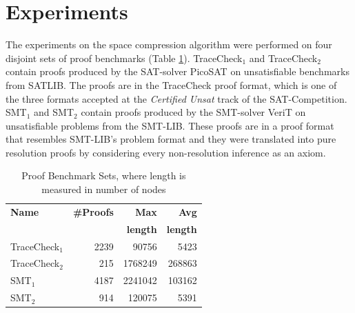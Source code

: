 \section{Experiments} 
\label{sec:experiments}

The experiments on the space compression algorithm were performed on four disjoint sets of proof benchmarks (Table \ref{tab:benchmarks}). 
TraceCheck$_1$ and TraceCheck$_2$ contain proofs produced by the SAT-solver PicoSAT \cite{Biere2008} on unsatisfiable benchmarks from SATLIB. 
The proofs are in the TraceCheck proof format, which is one of the three formats accepted at the \emph{Certified Unsat} track of the SAT-Competition.
SMT$_1$ and SMT$_2$ contain proofs produced by the SMT-solver VeriT \cite{Bouton2009} on unsatisfiable problems from the SMT-LIB. 
These proofs are in a proof format that resembles SMT-LIB's problem format and they were translated into pure resolution proofs by considering every non-resolution inference as an axiom.


\begin{table}[tb]
	\centering
	\setlength{\tabcolsep}{8pt}
	\caption{Proof Benchmark Sets, where length is measured in number of nodes}
	\label{tab:benchmarks}
	\begin{tabular}{lrrr}
		\toprule
		\textbf{Name} & \textbf{\#Proofs} & \textbf{Max} & \textbf{Avg} \\ 
		              &    & \textbf{length}  & \textbf{length} \\
		\midrule
		TraceCheck$_1$ & 2239 & 90756   & 5423   \\
		TraceCheck$_2$ & 215	& 1768249 & 268863 \\
    SMT$_1$ & 4187 & 2241042 & 103162 \\
    SMT$_2$ & 914  & 120075  & 5391  \\ 
		\bottomrule   
	\end{tabular}

\end{table}

